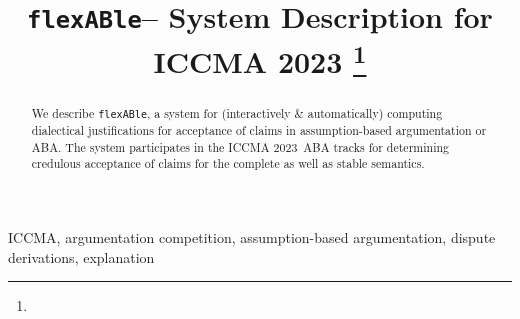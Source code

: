\documentclass[conference]{IEEEtran}
\newcommand{\flexable}{\texttt{flexABle}\xspace}
\newcommand{\iccma}{ICCMA 2023}
\begin{document}
\title{\flexable -- System Description for \iccma
  \thanks{}
}


\author{
\and    
{}
\and
{}
}





\maketitle

\begin{abstract} We describe \flexable, a system for (interactively \& automatically) computing dialectical justifications for acceptance of claims in assumption-based argumentation or ABA.  The system participates in the \iccma~ABA tracks for determining credulous acceptance of claims for the complete as well as stable semantics.      
\end{abstract}

\begin{IEEEkeywords}
ICCMA, argumentation competition, assumption-based argumentation, dispute derivations, explanation
\end{IEEEkeywords}
\end{document}
